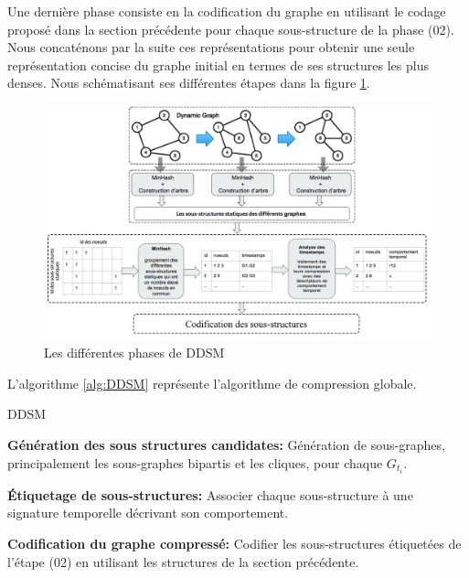			 Une dernière phase consiste en la codification du graphe en utilisant le codage proposé dans la section précédente pour chaque sous-structure de la phase (02). Nous concaténons par la suite ces représentations pour obtenir une seule représentation concise du graphe initial en termes de ses structures les plus denses. Nous schématisant ses différentes étapes dans la figure \ref{ddsm_scheme}.
		
		\begin{figure}[H]

	\includegraphics[scale=0.4]{./ressources/image/DDSM_scheme.png}
	\caption[Les différentes phases de DDSM]{Les différentes phases de DDSM}
	\label{ddsm_scheme}
\end{figure}	

		
			
		
			L'algorithme \ref{alg:DDSM} représente l'algorithme de compression globale.
			\begin{algorithm}
					\label{alg:DDSM}
					\caption{DDSM}
					\label{Pseudo Algorithme de la méthode proposée (DDSM)}
				\begin{algorithmic} [1]
					\STATE \textbf{Génération des sous structures candidates: }Génération de sous-graphes, principalement les sous-graphes bipartis et les cliques, pour chaque $G_{t_{i}}$.
					
					\STATE  \textbf{Étiquetage de sous-structures: }Associer chaque sous-structure à une signature temporelle décrivant son comportement.
					
					\STATE \textbf{Codification du graphe compressé: }Codifier les sous-structures étiquetées de l'étape (02) en utilisant les structures de la section précédente.
				\end{algorithmic}
			\end{algorithm}
			
